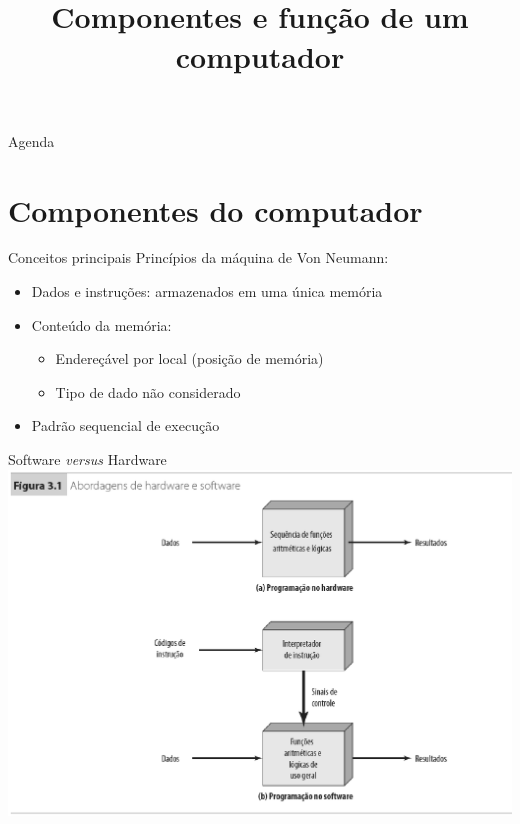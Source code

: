 



\title{\cursogrande\\ \vspace{1cm}Componentes e função de um computador}


   \maketitle[randomdots={false}]
   
   \begin{slide}{Agenda}
      \tableofcontents[content=sections]
   \end{slide}
\section[slide=true]{Componentes do computador}
\begin{slide}{Conceitos principais}
	Princípios da máquina de Von Neumann:
   \begin{itemize}
     \item Dados e instruções: armazenados em uma única memória
     \item Conteúdo da memória: 
	     \begin{itemize}
		     \item Endereçável por local (posição de memória)
		     \item Tipo de dado não considerado
	     \end{itemize}
     \item Padrão sequencial de execução
   \end{itemize}
\end{slide}

\begin{slide}{Software \emph{versus} Hardware}
   \centering
   \includegraphics[scale=0.95]{figs/softhard.eps}
\end{slide}

